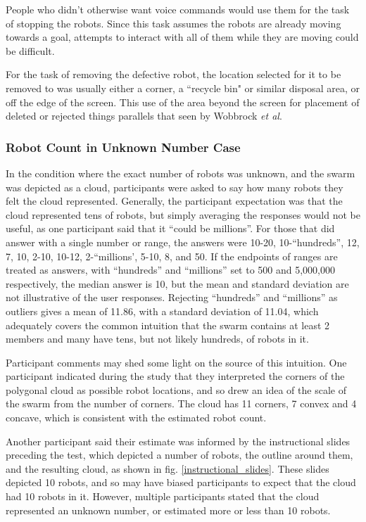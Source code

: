 People  who didn't otherwise want voice commands would use them for the task of stopping the robots. 
Since this task assumes the robots are already moving towards a goal, attempts to interact with all of them while they are moving could be difficult. 

For the task of removing the defective robot, the location selected for it to be removed to was usually either a corner, a ``recycle bin" or similar disposal area, or off the edge of the screen. This use of the area beyond the screen for placement of deleted or rejected things parallels that seen by Wobbrock \textit{et al}.

\subsubsection{Robot Count in Unknown Number Case}

In the condition where the exact number of robots was unknown, and the swarm was depicted as a cloud, participants were asked to say how many robots they felt the cloud represented. 
Generally, the participant expectation was that the cloud represented tens of robots, but simply averaging the responses would not be useful, as one participant said that it ``could be millions''. 
For those that did answer with a single number or range, the answers were 10-20, 10-``hundreds'', 12, 7, 10, 2-10, 10-12, 2-``millions', 5-10, 8, and 50. 
If the endpoints of ranges are treated as answers, with ``hundreds'' and ``millions'' set to 500 and 5,000,000 respectively, the median answer is 10, but the mean and standard deviation are not illustrative of the user responses. 
Rejecting ``hundreds'' and ``millions'' as outliers gives a mean of 11.86, with a standard deviation of 11.04, which adequately covers the common intuition that the swarm contains at least 2 members and many have tens, but not likely hundreds, of robots in it.

Participant comments may shed some light on the source of this intuition. 
One participant indicated during the study that they interpreted the corners of the polygonal cloud as possible robot locations, and so drew an idea of the scale of the swarm from the number of corners. 
The cloud has 11 corners, 7 convex and 4 concave, which is consistent with the estimated robot count. 

Another participant said their estimate was informed by the instructional slides preceding the test, which depicted a number of robots, the outline around them, and the resulting cloud, as shown in fig. \ref{instructional_slides}. 
These slides depicted 10 robots, and so may have biased participants to expect that the cloud had 10 robots in it. 
However, multiple participants stated that the cloud represented an unknown number, or estimated more or less than 10 robots.

